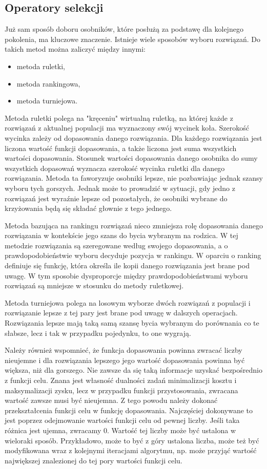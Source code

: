 \subsection{Operatory selekcji}
Już sam sposób doboru osobników, które posłużą za podstawę dla kolejnego pokolenia, ma kluczowe znaczenie. Istnieje wiele sposobów wyboru rozwiązań. Do takich metod można zaliczyć między innymi:
\begin{itemize}
\item metoda ruletki,
\item metoda rankingowa,
\item metoda turniejowa.
\end{itemize}

Metoda ruletki polega na "kręceniu" wirtualną ruletką, na której każde z rozwiązań z aktualnej populacji ma wyznaczony swój wycinek koła. Szerokość wycinka zależy od dopasowania danego rozwiązania. Dla każdego rozwiązania jest liczona wartość funkcji dopasowania, a także liczona jest suma wszystkich wartości dopasowania. Stosunek wartości dopasowania danego osobnika do sumy wszystkich dopasowań wyznacza szerokość wycinka ruletki dla danego rozwiązania. Metoda ta faworyzuje osobniki lepsze, nie pozbawiając jednak szansy wyboru tych gorszych. Jednak może to prowadzić w sytuacji, gdy jedno z rozwiązań jest wyraźnie lepsze od pozostałych, że osobniki wybrane do krzyżowania będą się składać głownie z tego jednego.

Metoda bazująca na rankingu rozwiązań nieco zmniejsza rolę dopasowania danego rozwiązania w kontekście jego szans do bycia wybranym na rodzica. W tej metodzie rozwiązania są szeregowane według swojego dopasowania, a o prawdopodobieństwie wyboru decyduje pozycja w rankingu. W oparciu o ranking definiuje się funkcję, która określa ile kopii danego rozwiązania jest brane pod uwagę. W tym sposobie dysproporcje między prawdopodobieństwami wyboru rozwiązań są mniejsze w stosunku do metody ruletkowej.

Metoda turniejowa polega na losowym wyborze dwóch rozwiązań z populacji i rozwiązanie lepsze z tej pary jest brane pod uwagę w dalszych operacjach. Rozwiązania lepsze mają taką samą szansę bycia wybranym do porównania co te słabsze, lecz i tak w przypadku pojedynku, to one wygrają.

Należy również wspomnieć, że funkcja dopasowania powinna zwracać liczby nieujemne i dla rozwiązania lepszego jego wartość dopasowania powinna być większa, niż dla gorszego. Nie zawsze da się taką informacje uzyskać bezpośrednio z funkcji celu. Znana jest własność dualności zadań minimalizacji kosztu i maksymalizacji zysku, lecz w przypadku funkcji przystosowania, zwracana wartość zawsze musi być nieujemna. Z tego powodu należy dokonać przekształcenia funkcji celu w funkcję dopasowania. Najczęściej  dokonywane to jest poprzez odejmowanie wartości funkcji celu od pewnej liczby. Jeśli taka różnica jest ujemna, zwracamy 0. Wartość tej liczby może być ustalona w wieloraki sposób. Przykładowo, może to być z góry ustalona liczba, może też być modyfikowana wraz z kolejnymi iteracjami algorytmu, np. może przyjąć wartość największej znalezionej do tej pory wartości funkcji celu.

